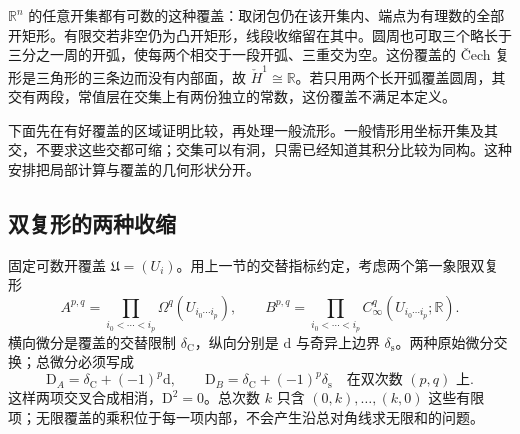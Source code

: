 \ProseParagraphBreak

\(\mathbb R^n\) 的任意开集都有可数的这种覆盖：取闭包仍在该开集内、端点为有理数的全部开矩形。有限交若非空仍为凸开矩形，线段收缩留在其中。圆周也可取三个略长于三分之一周的开弧，使每两个相交于一段开弧、三重交为空。这份覆盖的 Čech 复形是三角形的三条边而没有内部面，故 \(\check H^1\cong\mathbb R\)。若只用两个长开弧覆盖圆周，其交有两段，常值层在交集上有两份独立的常数，这份覆盖不满足本定义。

\ProseParagraphBreak

下面先在有好覆盖的区域证明比较，再处理一般流形。一般情形用坐标开集及其交，不要求这些交都可缩；交集可以有洞，只需已经知道其积分比较为同构。这种安排把局部计算与覆盖的几何形状分开。

\subsection{双复形的两种收缩}
\label{g2:subsec:0703:04}
固定可数开覆盖 \(\mathfrak U=(U_i)\)。用上一节的交替指标约定，考虑两个第一象限双复形
\[
	A^{p,q}=\prod_{i_0<\cdots<i_p}\Omega^q(U_{i_0\cdots i_p}),
	\qquad B^{p,q}=\prod_{i_0<\cdots<i_p}C_\infty^q(U_{i_0\cdots i_p};\mathbb R).
\]
横向微分是覆盖的交替限制 \(\delta_{\mathrm C}\)，纵向分别是 \(\mathrm d\) 与奇异上边界 \(\delta_{\mathrm s}\)。两种原始微分交换；总微分必须写成
\[
	\mathrm D_A=\delta_{\mathrm C}+(-1)^p\mathrm d,
	\qquad \mathrm D_B=\delta_{\mathrm C}+(-1)^p\delta_{\mathrm s}
	\quad\text{在双次数 }(p,q)\text{ 上}.
\]
这样两项交叉合成相消，\(\mathrm D^2=0\)。总次数 \(k\) 只含 \((0,k),\ldots,(k,0)\) 这些有限项；无限覆盖的乘积位于每一项内部，不会产生沿总对角线求无限和的问题。

